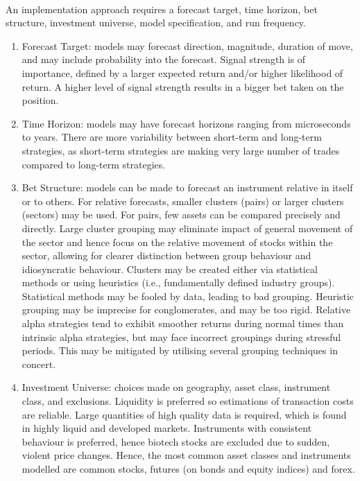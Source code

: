 \begin{method} \\
An implementation approach requires a forecast target, time horizon, bet structure, investment universe, model specification, and run frequency.
\begin{enumerate}[label=\roman*.]
\setlength{\itemsep}{0pt}
\item Forecast Target: models may forecast direction, magnitude, duration of move, and may include probability into the forecast. Signal strength is of importance, defined by a larger expected return and/or higher likelihood of return. A higher level of signal strength results in a bigger bet taken on the position.
\item Time Horizon: models may have forecast horizons ranging from microseconds to years. There are more variability between short-term and long-term strategies, as short-term strategies are making very large number of trades compared to long-term strategies.
\item Bet Structure: models can be made to forecast an instrument relative in itself or to others. For relative forecasts, smaller clusters (pairs) or larger clusters (sectors) may be used. For pairs, few assets can be compared precisely and directly. Large cluster grouping may eliminate impact of general movement of the sector and hence focus on the relative movement of stocks within the sector, allowing for clearer distinction between group behaviour and idiosyncratic behaviour. Clusters may be created either via statistical methods or using heuristics (i.e., fundamentally defined industry groups).\\
Statistical methods may be fooled by data, leading to bad grouping. Heuristic grouping may be imprecise for conglomerates, and may be too rigid. Relative alpha strategies tend to exhibit smoother returns during normal times than intrinsic alpha strategies, but may face incorrect groupings during stressful periods. This may be mitigated by utilising several grouping techniques in concert.
\item Investment Universe: choices made on geography, asset class, instrument class, and exclusions. Liquidity is preferred so estimations of transaction costs are reliable. Large quantities of high quality data is required, which is found in highly liquid and developed markets. Instruments with consistent behaviour is preferred, hence biotech stocks are excluded due to sudden, violent price changes. Hence, the most common asset classes and instruments modelled are common stocks, futures (on bonds and equity indices) and forex.

\end{enumerate}
\end{method}

